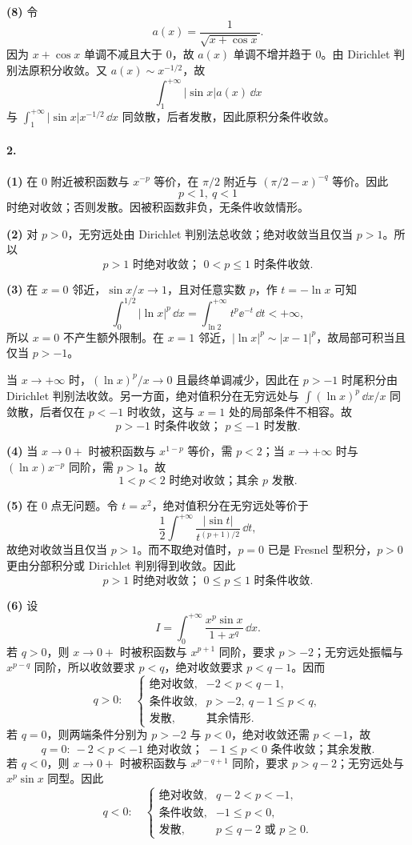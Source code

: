 \textbf{(8)} 令
\[
  a(x)=\frac1{\sqrt{x+\cos x}}.
\]
因为 $x+\cos x$ 单调不减且大于 $0$，故 $a(x)$ 单调不增并趋于 $0$。由 Dirichlet 判别法原积分收敛。又 $a(x)\sim x^{-1/2}$，故
\[
  \int_1^{+\infty}|\sin x|a(x)\,\dd x
\]
与 $\int_1^{+\infty}|\sin x|x^{-1/2}\,\dd x$ 同敛散，后者发散，因此原积分条件收敛。

\paragraph{2.}
\textbf{(1)} 在 $0$ 附近被积函数与 $x^{-p}$ 等价，在 $\pi/2$ 附近与 $(\pi/2-x)^{-q}$ 等价。因此
\[
  \boxed{p<1,\ q<1}
\]
时绝对收敛；否则发散。因被积函数非负，无条件收敛情形。

\textbf{(2)} 对 $p>0$，无穷远处由 Dirichlet 判别法总收敛；绝对收敛当且仅当 $p>1$。所以
\[
  \boxed{p>1\text{ 时绝对收敛； }0<p\leq1\text{ 时条件收敛}.}
\]

\textbf{(3)} 在 $x=0$ 邻近，$\sin x/x\to1$，且对任意实数 $p$，作 $t=-\ln x$ 可知
\[
  \int_0^{1/2}|\ln x|^p\,\dd x
  =\int_{\ln2}^{+\infty}t^p\ee^{-t}\,\dd t<+\infty,
\]
所以 $x=0$ 不产生额外限制。在 $x=1$ 邻近，$|\ln x|^p\sim|x-1|^p$，故局部可积当且仅当 $p>-1$。

当 $x\to+\infty$ 时，$(\ln x)^p/x\to0$ 且最终单调减少，因此在 $p>-1$ 时尾积分由 Dirichlet 判别法收敛。另一方面，绝对值积分在无穷远处与
$\int (\ln x)^p\,\dd x/x$ 同敛散，后者仅在 $p<-1$ 时收敛，这与 $x=1$ 处的局部条件不相容。故
\[
  \boxed{p>-1\text{ 时条件收敛； }p\leq-1\text{ 时发散}.}
\]

\textbf{(4)} 当 $x\to0+$ 时被积函数与 $x^{1-p}$ 等价，需 $p<2$；当 $x\to+\infty$ 时与 $(\ln x)x^{-p}$ 同阶，需 $p>1$。故
\[
  \boxed{1<p<2\text{ 时绝对收敛；其余 }p\text{ 发散}.}
\]

\textbf{(5)} 在 $0$ 点无问题。令 $t=x^2$，绝对值积分在无穷远处等价于
\[
  \frac12\int^{+\infty}\frac{|\sin t|}{t^{(p+1)/2}}\,\dd t,
\]
故绝对收敛当且仅当 $p>1$。而不取绝对值时，$p=0$ 已是 Fresnel 型积分，$p>0$ 更由分部积分或 Dirichlet 判别得到收敛。因此
\[
  \boxed{p>1\text{ 时绝对收敛； }0\leq p\leq1\text{ 时条件收敛}.}
\]

\textbf{(6)} 设
\[
  I=\int_0^{+\infty}\frac{x^p\sin x}{1+x^q}\,\dd x.
\]
若 $q>0$，则 $x\to0+$ 时被积函数与 $x^{p+1}$ 同阶，要求 $p>-2$；无穷远处振幅与 $x^{p-q}$ 同阶，所以收敛要求 $p<q$，绝对收敛要求 $p<q-1$。因而
\[
  \boxed{q>0:\quad
  \begin{cases}
  \text{绝对收敛},&-2<p<q-1,\\
  \text{条件收敛},&p>-2,\ q-1\leq p<q,\\
  \text{发散},&\text{其余情形}.
  \end{cases}}
\]
若 $q=0$，则两端条件分别为 $p>-2$ 与 $p<0$，绝对收敛还需 $p<-1$，故
\[
  \boxed{q=0:\ -2<p<-1\text{ 绝对收敛； }-1\leq p<0\text{ 条件收敛；其余发散}.}
\]
若 $q<0$，则 $x\to0+$ 时被积函数与 $x^{p-q+1}$ 同阶，要求 $p>q-2$；无穷远处与 $x^p\sin x$ 同型。因此
\[
  \boxed{q<0:\quad
  \begin{cases}
  \text{绝对收敛},&q-2<p<-1,\\
  \text{条件收敛},&-1\leq p<0,\\
  \text{发散},&p\leq q-2\text{ 或 }p\geq0.
  \end{cases}}
\]

